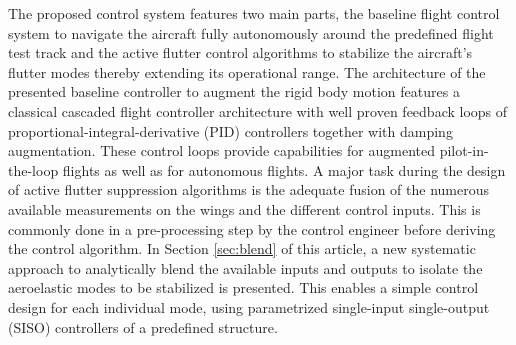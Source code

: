 \documentclass[aerospace,article,submit,moreauthors,pdftex,10pt,a4paper]{Definitions/mdpi}
\begin{document}
The proposed control system features two main parts, the baseline flight control system to navigate the aircraft fully autonomously around the predefined flight test track and the active flutter control algorithms to stabilize the aircraft's flutter modes thereby extending its operational range.
The architecture of the presented baseline controller to augment the rigid body motion features a classical cascaded flight controller architecture \cite{brock11,Stevens15,Theis18cep} with well proven feedback loops of proportional-integral-derivative (PID) controllers together with damping augmentation. These control loops provide capabilities for augmented pilot-in-the-loop flights  as well as for autonomous flights.  A major task during the design of active flutter suppression algorithms is the adequate fusion of the numerous available measurements on the wings and the different control inputs. This is commonly done in a  pre-processing step by the control engineer before deriving the control algorithm. 
In Section \ref{sec:blend} of this article, a new systematic  approach to analytically blend the available inputs and outputs to isolate the aeroelastic modes to be stabilized is presented. This enables a simple control design for each individual mode, using parametrized single-input single-output (SISO) controllers of a predefined structure.
\end{document}
